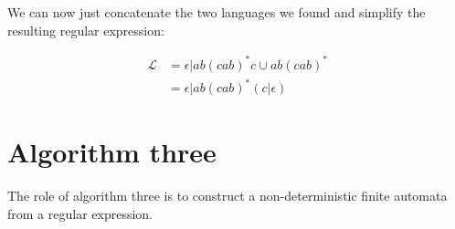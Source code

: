 We can now just concatenate the two languages we found and simplify the
resulting regular expression:

\[
	\begin{split}
		\mathcal{L} &= \epsilon | ab(cab)^*c \cup ab(cab)^*\\
					&= \epsilon | ab(cab)^* (c|\epsilon)
	\end{split}
\]

\section{Algorithm three}

The role of algorithm three is to construct a non-deterministic finite automata
from a regular expression.
